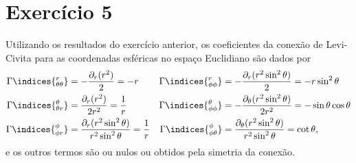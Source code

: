 \section*{Exercício 5}
Utilizando os resultados do exercício anterior, os coeficientes da conexão de Levi-Civita para as coordenadas esféricas no espaço Euclidiano são dados por
\begin{align*}
    \Gamma\indices{^r_{\theta\theta}} &= -\frac{\partial_r(r^2)}{2} = -r & \Gamma\indices{^r_{\phi\phi}} &= - \frac{\partial_r(r^2\sin^2\theta)}{2} = -r\sin^2\theta\\
    \Gamma\indices{^\theta_{\theta r}} &= \frac{\partial_r (r^2)}{2r^2} = \frac{1}{r} & \Gamma\indices{^\theta_{\phi\phi}} &= -\frac{\partial_\theta(r^2\sin^2\theta)}{2r^2} = -\sin\theta\cos\theta\\
    \Gamma\indices{^\phi_{\phi r}} &= \frac{\partial_r (r^2 \sin^2\theta)}{r^2\sin^2\theta} = \frac{1}{r} & \Gamma\indices{^\phi_{\phi\theta}} &= \frac{\partial_\theta (r^2\sin^2\theta)}{r^2\sin^2\theta} = \cot\theta,
\end{align*}
e os outros termos são ou nulos ou obtidos pela simetria da conexão.

